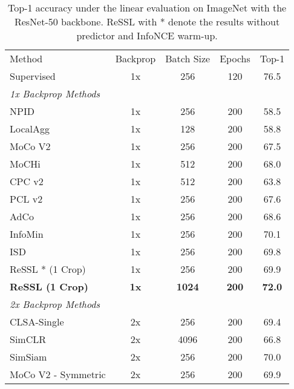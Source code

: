 \documentclass{article}
\newcommand{\<}{\left\langle}
\renewcommand{\>}{\right\rangle}
\begin{document}
\renewcommand\arraystretch{1.0}
\begin{table}[h] 
 \setlength\tabcolsep{3pt}
 \centering
 \vspace{-8pt}
 \caption{Top-1 accuracy under the linear evaluation on ImageNet with the ResNet-50 backbone. ReSSL with * denote the results without predictor and InfoNCE warm-up.}
 \label{table:200epoch}
 \vspace{-10pt}
\begin{tabular}{l c c c c } 
\toprule 
Method &  Backprop  & Batch Size  & Epochs & Top-1 \\
Supervised & 1x & 256 &  120 & 76.5 \\ \hline
\emph{1x Backprop Methods } \\
NPID \cite{instance_discrimination}      & 1x &  256 &  200 & 58.5 \\
LocalAgg \cite{local}                    & 1x &  128 & 200 & 58.8 \\
MoCo V2 \cite{mocov2}                    & 1x &  256 &  200 & 67.5 \\
MoCHi \cite{mochi}                       & 1x &  512 &  200 & 68.0 \\
CPC v2 \cite{cpc}                        & 1x &  512 &  200 & 63.8 \\
PCL v2 \cite{PCL}                        & 1x &  256 &  200 & 67.6 \\
AdCo \cite{adco}                         & 1x &  256 &  200 & 68.6 \\
InfoMin \cite{goodview}                  & 1x &  256 &  200 & 70.1 \\
ISD \cite{ISD}                           & 1x &  256 &  200 & 69.8 \\
\textcolor{collapsed}{ReSSL * (1 Crop) \cite{ressl}}   & \textcolor{collapsed}{1x}  & \textcolor{collapsed}{256} &  \textcolor{collapsed}{200} & \textcolor{collapsed}{69.9} \\
\textbf{ReSSL (1 Crop)}                  & \textbf{1x}  & \textbf{1024} &  \textbf{200} & \textbf{72.0} \\
\bottomrule
\emph{2x Backprop Methods } \\
CLSA-Single \cite{stronger}              & 2x &  256  &  200 & 69.4 \\
SimCLR \cite{simclr}                     & 2x &  4096 &  200 & 66.8 \\
SimSiam \cite{SimSiam}  & 2x   & 256  &  200 & 70.0 \\
MoCo V2 - Symmetric \cite{SimSiam}   & 2x  & 256 & 200 & 69.9 \\ 

\end{tabular}
\end{table}
\end{document}
